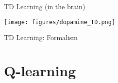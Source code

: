\documentclass{beamer}
\begin{document}
\begin{frame}{TD Learning (in the brain)}

\begin{center}
\texttt{[image: figures/dopamine\_TD.png]}
\end{center}
\end{frame}

\begin{frame}{TD Learning: Formalism}
\end{frame}

\section{Q-learning}
\end{document}
